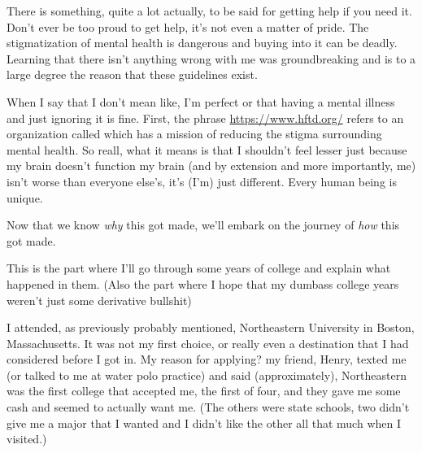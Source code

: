 \documentclass[./butidigress.tex]{subfiles}
\begin{document}
There is something, quite a lot actually, to be said for getting help if you need it.
Don't ever be too proud to get help, it's not even a matter of pride.
The stigmatization of mental health is dangerous and buying into it can be deadly.
Learning that there isn't anything wrong with me was groundbreaking and is to a large degree the reason that these guidelines exist.

When I say that  I don't mean like, I'm perfect or that having a mental illness and just ignoring it is fine.
First, the phrase \href{it's okay not to be okay}{https://www.hftd.org/} refers to an organization called  which has a mission of reducing the stigma surrounding mental health.
So reall, what it means is that I shouldn't feel lesser just because my brain doesn't function  my brain (and by extension and more importantly, me) isn't worse than everyone else's, it's (I'm) just different.
Every human being is unique.

Now that we know \emph{why} this got made, we'll embark on the journey of \emph{how} this got made.

\label{subsec:narrative}
This is the part where I'll go through some years of college and explain what happened in them.
(Also the part where I hope that my dumbass college years weren't just some derivative bullshit)

I attended, as previously probably mentioned, Northeastern University in Boston, Massachusetts.
It was not my first choice, or really even a destination that I had considered before I got in.
My reason for applying? my friend, Henry, texted me (or talked to me at water polo practice) and said (approximately), 
Northeastern was the first college that accepted me, the first of four, and they gave me some cash and seemed to actually want me.
(The others were state schools, two didn't give me a major that I wanted and I didn't like the other all that much when I visited.)
\end{document}

